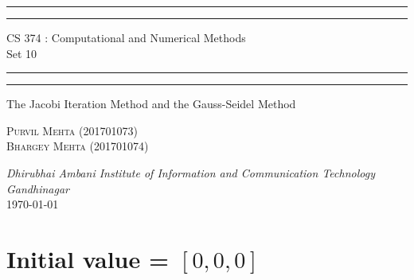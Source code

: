\documentclass{article}
\begin{document}
\begin{titlepage}
	\centering 
	\scshape
	\vspace*{\baselineskip}
	\rule{\textwidth}{1.6pt}\vspace*{-\baselineskip}\vspace*{2pt}
	\rule{\textwidth}{0.4pt} 
	\vspace{0.75\baselineskip}
	
	{\Large CS 374 : Computational and Numerical Methods \\\vspace{0.75\baselineskip} Set 10}
	\vspace{0.75\baselineskip}
	
	\rule{\textwidth}{0.4pt}\vspace*{-\baselineskip}\vspace{3.2pt} 
	\rule{\textwidth}{1.6pt}
	
	\vspace{2\baselineskip}  
	 The Jacobi Iteration Method and the Gauss-Seidel Method
	
	\vspace*{3\baselineskip}
	
	\vspace{0.5\baselineskip} %
	
	{\scshape\large Purvil Mehta (201701073) \\ Bhargey Mehta (201701074) \\} 
	
	\vspace{1\baselineskip} 
	
	\textit{Dhirubhai Ambani Institute of Information and Communication Technology \\ Gandhinagar\\} 
	\vspace*{2\baselineskip}
	\today


\end{titlepage}

\newpage
\tableofcontents
\newpage

\section{Initial value = $[0, 0, 0]$}
\end{document}
